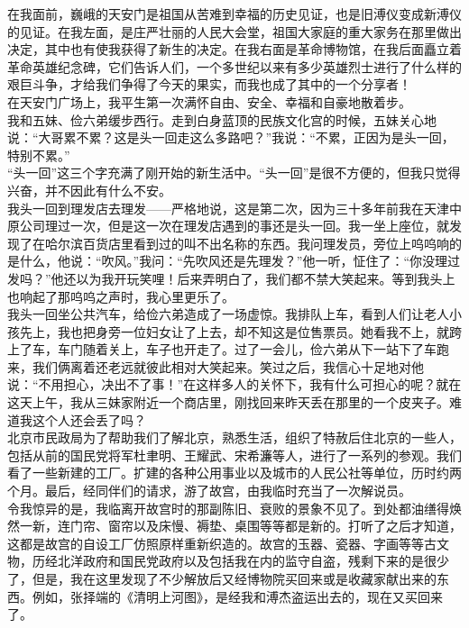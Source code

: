 在我面前，巍峨的天安门是祖国从苦难到幸福的历史见证，也是旧溥仪变成新溥仪的见证。在我左面，是庄严壮丽的人民大会堂，祖国大家庭的重大家务在那里做出决定，其中也有使我获得了新生的决定。在我右面是革命博物馆，在我后面矗立着革命英雄纪念碑，它们告诉人们，一个多世纪以来有多少英雄烈士进行了什么样的艰巨斗争，才给我们争得了今天的果实，而我也成了其中的一个分享者！\\

在天安门广场上，我平生第一次满怀自由、安全、幸福和自豪地散着步。\\

我和五妹、俭六弟缓步西行。走到白身蓝顶的民族文化宫的时候，五妹关心地说：“大哥累不累？这是头一回走这么多路吧？”我说：“不累，正因为是头一回，特别不累。”\\

“头一回”这三个字充满了刚开始的新生活中。“头一回”是很不方便的，但我只觉得兴奋，并不因此有什么不安。\\

我头一回到理发店去理发——严格地说，这是第二次，因为三十多年前我在天津中原公司理过一次，但是这一次在理发店遇到的事还是头一回。我一坐上座位，就发现了在哈尔滨百货店里看到过的叫不出名称的东西。我问理发员，旁位上呜呜响的是什么，他说：“吹风。”我问：“先吹风还是先理发？”他一听，怔住了：“你没理过发吗？”他还以为我开玩笑哩！后来弄明白了，我们都不禁大笑起来。等到我头上也响起了那呜呜之声时，我心里更乐了。\\

我头一回坐公共汽车，给俭六弟造成了一场虚惊。我排队上车，看到人们让老人小孩先上，我也把身旁一位妇女让了上去，却不知这是位售票员。她看我不上，就跨上了车，车门随着关上，车子也开走了。过了一会儿，俭六弟从下一站下了车跑来，我们俩离着还老远就彼此相对大笑起来。笑过之后，我信心十足地对他说：“不用担心，决出不了事！”在这样多人的关怀下，我有什么可担心的呢？就在这天上午，我从三妹家附近一个商店里，刚找回来昨天丢在那里的一个皮夹子。难道我这个人还会丢了吗？\\

北京市民政局为了帮助我们了解北京，熟悉生活，组织了特赦后住北京的一些人，包括从前的国民党将军杜聿明、王耀武、宋希濂等人，进行了一系列的参观。我们看了一些新建的工厂。扩建的各种公用事业以及城市的人民公社等单位，历时约两个月。最后，经同伴们的请求，游了故宫，由我临时充当了一次解说员。\\

令我惊异的是，我临离开故宫时的那副陈旧、衰败的景象不见了。到处都油缮得焕然一新，连门帘、窗帘以及床慢、褥垫、桌围等等都是新的。打听了之后才知道，这都是故宫的自设工厂仿照原样重新织造的。故宫的玉器、瓷器、字画等等古文物，历经北洋政府和国民党政府以及包括我在内的监守自盗，残剩下来的是很少了，但是，我在这里发现了不少解放后又经博物院买回来或是收藏家献出来的东西。例如，张择端的《清明上河图》，是经我和溥杰盗运出去的，现在又买回来了。\\

